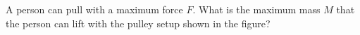 A person can pull with a maximum force $F$. What is the
maximum mass $M$ that the person can lift with the pulley setup shown
in the figure?
